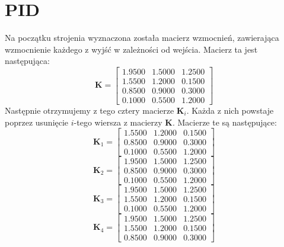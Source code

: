 \chapter{PID}
Na początku strojenia wyznaczona została macierz wzmocnień, zawierająca
wzmocnienie każdego z wyjść w zależności od wejścia. Macierz ta jest następująca:
\begin{equation}
  \bm{K} =
  \begin{bmatrix}
    \num{1.9500}  &  \num{1.5000}  &  \num{1.2500} \\
    \num{1.5500}  &  \num{1.2000}  &  \num{0.1500} \\
    \num{0.8500}  &  \num{0.9000}  &  \num{0.3000} \\
    \num{0.1000} &   \num{0.5500}  &  \num{1.2000}
  \end{bmatrix}
\end{equation}
Następnie otrzymujemy z tego cztery macierze $\bm{K}_i$. Każda z nich powstaje poprzez
usunięcie $i$-tego wiersza z macierzy $\bm{K}$. Macierze te są następujące:
\begin{equation}
  \bm{K}_1 =
  \begin{bmatrix}
    \num{1.5500}   & \num{1.2000} &   \num{0.1500} \\
        \num{0.8500}   & \num{0.9000} &   \num{0.3000} \\
        \num{0.1000}   & \num{0.5500}  &  \num{1.2000}
  \end{bmatrix}
\end{equation}
\begin{equation}
  \bm{K}_2 =
  \begin{bmatrix}
    \num{1.9500} &   \num{1.5000} &   \num{1.2500} \\
       \num{0.8500}   & \num{0.9000} &   \num{0.3000} \\
       \num{0.1000}   & \num{0.5500} &   \num{1.2000}
  \end{bmatrix}
\end{equation}
\begin{equation}
  \bm{K}_3 =
  \begin{bmatrix}
    \num{1.9500} &   \num{1.5000} &   \num{1.2500} \\
       \num{1.5500}   & \num{1.2000} &   \num{0.1500} \\
       \num{0.1000}   & \num{0.5500}  &  \num{1.2000}
  \end{bmatrix}
\end{equation}
\begin{equation}
  \bm{K}_4 =
  \begin{bmatrix}
    \num{1.9500}  &  \num{1.5000}  &  \num{1.2500} \\
    \num{1.5500}  &  \num{1.2000}  &  \num{0.1500} \\
    \num{0.8500}  &  \num{0.9000}  &  \num{0.3000}
  \end{bmatrix}
\end{equation}
